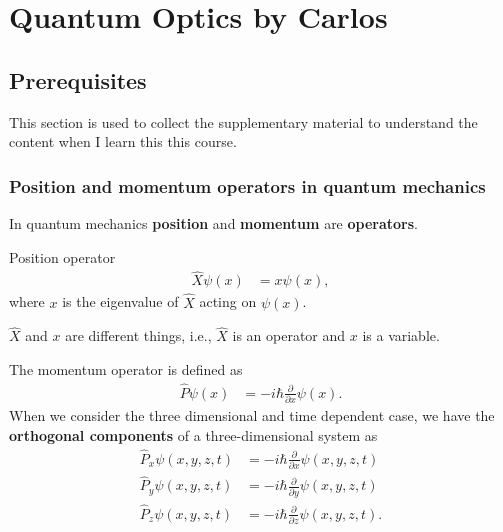 \documentclass[../../note.tex]{subfiles}
\begin{document}
\chapter{Quantum Optics by Carlos}
\section{Prerequisites}
This section is used to collect the supplementary material to understand the content when I learn this  this course.

\subsection{Position and momentum operators in quantum mechanics}
In quantum mechanics \textbf{position} and \textbf{momentum} are \textbf{operators}.

\begin{definition}
    Position operator
    \begin{align}
        \hat{X} \psi(x)
        &= x \psi(x),
    \end{align}
    where $x$ is the eigenvalue of $\hat{X}$ acting on $\psi(x)$.
\end{definition}

$\hat{X}$ and $x$ are different things, i.e., $\hat{X}$ is an operator and $x$ is a variable.

\begin{definition}
  The momentum operator is defined as
  \begin{align}
    \hat{P} \psi(x) 
    &= -i \hbar \frac{\partial}{\partial x} \psi(x).
  \end{align}
  When we consider the three dimensional and time dependent case, we have the \textbf{orthogonal components} of a three-dimensional system as
  \begin{align}
    \hat{P}_x \psi(x,y,z,t)
    &= -i \hbar \frac{\partial}{\partial x} \psi(x,y,z,t) \\
    \hat{P}_y \psi(x,y,z,t)
    &= -i \hbar \frac{\partial}{\partial y} \psi(x,y,z,t) \\
    \hat{P}_z \psi(x,y,z,t)
    &= -i \hbar \frac{\partial}{\partial z} \psi(x,y,z,t).
  \end{align}
\end{definition}
\end{document}
